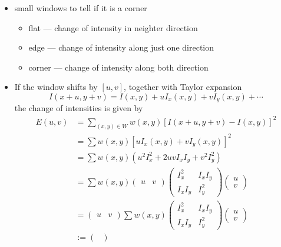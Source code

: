 \documentclass[twocolumn,landscape,10pt]{article}
\theoremstyle{definition}
\begin{document}
\begin{itemize}
    \item small windows to tell if it is a corner
        \begin{itemize}
            \item flat --- change of intensity in neighter direction
            \item edge --- change of intensity along just one direction
            \item corner --- change of intensity along both direction
        \end{itemize} 
    \item If the window shifts by $[u,v]$, together with Taylor expansion
        \[
            I(x+u,y+v)=I(x,y)+uI_x(x,y)+vI_y(x,y)+\cdots
        \]the change of intensities is given by
        \begin{align*}
            E(u,v)
            &=\sum_{(x,y)\in W} w(x,y){[I(x+u,y+v)-I(x,y)]}^{2}\\
            &=\sum w(x,y){[uI_x(x,y)+vI_y(x,y)]}^{2}\\
            &=\sum w(x,y)(u^2I_x^2+2uvI_xI_y+v^2I_y^2)\\
            &=\sum w(x,y)
            \begin{pmatrix}
                u & v
            \end{pmatrix} 
            \begin{pmatrix}
                I_x^2 & I_xI_y \\
                I_xI_y & I_y^2
            \end{pmatrix} 
            \begin{pmatrix}
                u \\
                v
            \end{pmatrix} \\
            &=\begin{pmatrix}
                u & v
            \end{pmatrix} 
            \sum w(x,y)\begin{pmatrix}
                I_x^2 & I_xI_y \\
                I_xI_y & I_y^2
            \end{pmatrix} 
            \begin{pmatrix}
                u \\
                v
            \end{pmatrix} \\
            &:=\begin{pmatrix}

\end{pmatrix}
\end{align*}
\end{itemize}
\end{document}
